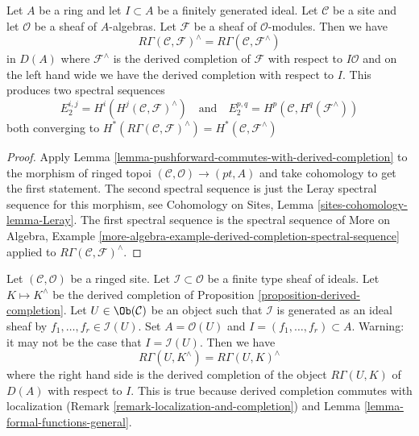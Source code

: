 \begin{lemma}
\label{lemma-formal-functions-general}
Let $A$ be a ring and let $I \subset A$ be a finitely generated ideal.
Let $\mathcal{C}$ be a site and let $\mathcal{O}$ be a sheaf
of $A$-algebras. Let $\mathcal{F}$ be a sheaf of $\mathcal{O}$-modules.
Then we have
$$
R\Gamma(\mathcal{C}, \mathcal{F})^\wedge =
R\Gamma(\mathcal{C}, \mathcal{F}^\wedge)
$$
in $D(A)$ where $\mathcal{F}^\wedge$ is the derived
completion of $\mathcal{F}$ with respect to $I\mathcal{O}$ and on the
left hand wide we have the derived completion with respect to $I$.
This produces two spectral sequences
$$
E_2^{i, j} = H^i(H^j(\mathcal{C}, \mathcal{F})^\wedge)
\quad\text{and}\quad
E_2^{p, q} = H^p(\mathcal{C}, H^q(\mathcal{F}^\wedge))
$$
both converging to
$H^*(R\Gamma(\mathcal{C}, \mathcal{F})^\wedge) =
H^*(\mathcal{C}, \mathcal{F}^\wedge)$
\end{lemma}

\begin{proof}
Apply Lemma \ref{lemma-pushforward-commutes-with-derived-completion}
to the morphism of ringed topoi $(\mathcal{C}, \mathcal{O}) \to (pt, A)$
and take cohomology to get the first statement. The second spectral sequence
is just the Leray spectral sequence for this morphism, see
Cohomology on Sites, Lemma \ref{sites-cohomology-lemma-Leray}.
The first spectral sequence is the spectral sequence of
More on Algebra, Example
\ref{more-algebra-example-derived-completion-spectral-sequence}
applied to $R\Gamma(\mathcal{C}, \mathcal{F})^\wedge$.
\end{proof}

\begin{remark}
\label{remark-local-calculation-derived-completion}
Let $(\mathcal{C}, \mathcal{O})$ be a ringed site.
Let $\mathcal{I} \subset \mathcal{O}$ be a finite type sheaf of
ideals. Let $K \mapsto K^\wedge$ be the derived completion of
Proposition \ref{proposition-derived-completion}.
Let $U \in \Ob(\mathcal{C})$ be an object such that $\mathcal{I}$
is generated as an ideal sheaf by $f_1, \ldots, f_r \in \mathcal{I}(U)$.
Set $A = \mathcal{O}(U)$ and $I = (f_1, \ldots, f_r) \subset A$.
Warning: it may not be the case that $I = \mathcal{I}(U)$.
Then we have
$$
R\Gamma(U, K^\wedge) = R\Gamma(U, K)^\wedge
$$
where the right hand side is the derived completion of
the object $R\Gamma(U, K)$ of $D(A)$ with respect to $I$.
This is true because derived completion commutes with localization
(Remark \ref{remark-localization-and-completion}) and
Lemma \ref{lemma-formal-functions-general}.
\end{remark}








